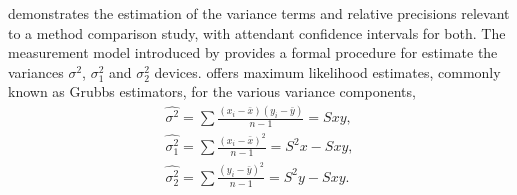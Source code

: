 \documentclass[12pt, a4paper]{report}
\theoremstyle{plain}
\theoremstyle{definition}
\theoremstyle{remark}
\begin{document}
\citet{Kinsella} demonstrates the estimation of the variance terms and relative precisions relevant to a method comparison study, with attendant confidence intervals for both. The measurement model introduced by \citet{Grubbs48,Grubbs73} provides a formal procedure for estimate the variances $\sigma^2$, $\sigma^2_{1}$ and $\sigma^2_{2}$ devices. \citet{Grubbs48} offers maximum likelihood estimates, commonly known as Grubbs estimators, for the various variance components, 
\begin{eqnarray*}
	\hat{\sigma^{2}} = \sum{\frac{(x_{i}-\bar{x})(y_{i}-\bar{y})}{n-1}} = Sxy,\\
	\hat{\sigma^{2}_{1}} = \sum{\frac{(x_{i}-\bar{x})^{2}}{n-1}} =S^{2}x - Sxy,  \\
	\hat{\sigma^{2}_{2}} =
	\sum{\frac{(y_{i}-\bar{y})^{2}}{n-1}} = S^{2}y - Sxy.
\end{eqnarray*}

\end{document}
